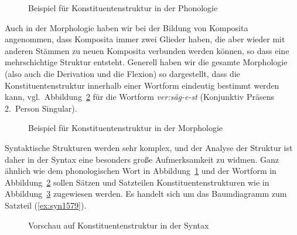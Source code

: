 \begin{figure}[!htbp]
  \centering
  \ThePhonStr
  \caption{Beispiel für Konstituentenstruktur in der Phonologie}
  \label{fig:phonstr-rev}
\end{figure}

Auch in der Morphologie haben wir \zB bei der Bildung von Komposita angenommen, dass Komposita immer zwei Glieder haben, die aber wieder mit anderen Stämmen zu neuen Komposita verbunden werden können, so dass eine mehrschichtige Struktur entsteht.
Generell haben wir die gesamte Morphologie (also auch die Derivation und die Flexion) so dargestellt, dass die Konstituentenstruktur innerhalb einer Wortform eindeutig bestimmt werden kann, vgl.\ Abbildung~\ref{fig:morphstr-rev} für die Wortform \textit{ver:säg-e-st} (Konjunktiv Präsens 2.~Person Singular).

\begin{figure}[!htbp]
  \centering
  \caption{Beispiel für Konstituentenstruktur in der Morphologie}
  \label{fig:morphstr-rev}
\end{figure}

Syntaktische Strukturen werden sehr komplex, und der Analyse der Struktur ist daher in der Syntax eine besonders große Aufmerksamkeit zu widmen.
Ganz ähnlich wie dem phonologischen Wort in Abbildung~\ref{fig:phonstr-rev} und der Wortform in Abbildung~\ref{fig:morphstr-rev} sollen Sätzen und Satzteilen Konstituentenstrukturen wie in Abbildung~\ref{fig:synstr-pre} zugewiesen werden.
Es handelt sich um das Baumdiagramm zum Satzteil (\ref{ex:syn1579}).

\begin{exe}
\end{exe}

\begin{figure}[!htbp]
  \centering
  \caption{Vorschau auf Konstituentenstruktur in der Syntax}
  \label{fig:synstr-pre}
\end{figure}

